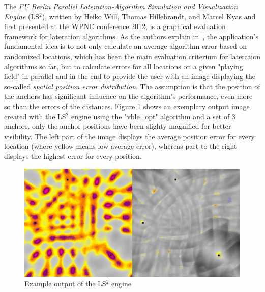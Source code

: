 The \emph{FU Berlin Parallel Lateration-Algorithm Simulation and Visualization Engine} (LS$^{2}$), written by Heiko Will, Thomas Hillebrandt, and Marcel Kyas and first presented at the WPNC conference 2012, is a graphical evaluation framework for lateration algorithms. As the authors explain in~\cite{will2012ls2}, the application's fundamental idea is to not only calculate an average algorithm error based on randomized locations, which has been the main evaluation criterium for lateration algorithms so far, but to calculate errors for all locations on a given "playing field" in parallel and in the end to provide the user with an image displaying the so-called \emph{spatial position error distribution}. The assumption is that the position of the anchors has significant influence on the algorithm's performance, even more so than the errors of the distances. Figure \ref{fig:lateration} shows an exemplary output image created with the LS$^{2}$ engine using the "vble\_opt" algorithm and a set of 3 anchors, only the anchor positions have been slighty magnified for better visibility. The left part of the image displays the average position error for every location (where yellow means low average error), whereas part to the right displays the highest error for every position.

\begin{figure}[h]
\begin{center}
\includegraphics[width=14cm]{img/lateration}
\end{center}
\caption{Example output of the LS$^{2}$ engine}
\label{fig:lateration}
\end{figure}

